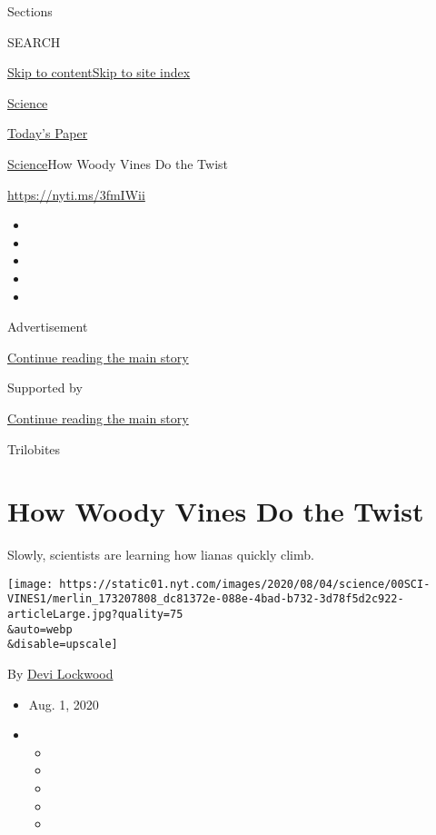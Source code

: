 Sections

SEARCH

\protect\hyperlink{site-content}{Skip to
content}\protect\hyperlink{site-index}{Skip to site index}

\href{https://www.nytimes.com/section/science}{Science}

\href{https://myaccount.nytimes.com/auth/login?response_type=cookie\&client_id=vi}{}

\href{https://www.nytimes.com/section/todayspaper}{Today's Paper}

\href{/section/science}{Science}\textbar{}How Woody Vines Do the Twist

\url{https://nyti.ms/3fmIWii}

\begin{itemize}
\item
\item
\item
\item
\item
\end{itemize}

Advertisement

\protect\hyperlink{after-top}{Continue reading the main story}

Supported by

\protect\hyperlink{after-sponsor}{Continue reading the main story}

Trilobites

\hypertarget{how-woody-vines-do-the-twist}{%
\section{How Woody Vines Do the
Twist}\label{how-woody-vines-do-the-twist}}

Slowly, scientists are learning how lianas quickly climb.

\texttt{[image: https://static01.nyt.com/images/2020/08/04/science/00SCI-VINES1/merlin\_173207808\_dc81372e-088e-4bad-b732-3d78f5d2c922-articleLarge.jpg?quality=75\\\&auto=webp\\\&disable=upscale]}

By \href{https://www.nytimes.com/by/devi-lockwood}{Devi Lockwood}

\begin{itemize}
\item
  Aug. 1, 2020
\item
  \begin{itemize}
  \item
  \item
  \item
  \item
  \item
  \end{itemize}
\end{itemize}

